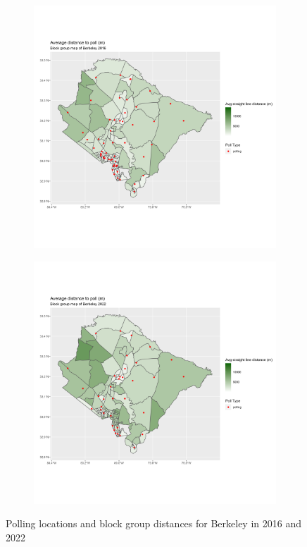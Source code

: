 \documentclass[11pt]{article}
\theoremstyle{remark}
\theoremstyle{definition}
\begin{document}
\begin{figure}
	\begin{subfigure}{.5\textwidth}
		\centering
		\includegraphics[width=\linewidth]{result_analysis/Berkeley_County_SC_original_configs/distance_map_Berkeley_config_original_2016_polls.png}
		\label{sfig:York_2016_bg_dist}
	\end{subfigure} 
	\begin{subfigure}{.5\textwidth}
		\centering
		\includegraphics[width=\linewidth]{result_analysis/Berkeley_County_SC_original_configs/distance_map_Berkeley_config_original_2022_polls.png}
		\label{sfig:Berkeley_2022_bg_dist}
	\end{subfigure}
	\caption{Polling locations and block group distances for Berkeley in 2016 and 2022}
	\label{fig:Berkeley distance maps}
\end{figure}
\end{document}
